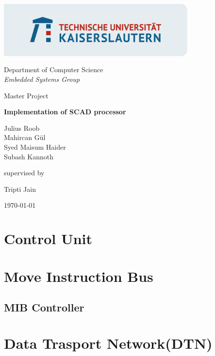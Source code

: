 \documentclass[adraft]{eptcs}
\begin{document}
\begin{titlepage}
	\title{}
	\centering
	\includegraphics[width=0.75\textwidth]{TUKL_LOGO_FELD_LINKS_RGB}\par\vspace{1cm}
	{\Large Department of Computer Science \\ \it Embedded Systems Group \par}
	\vspace{1cm}
	{\Large Master Project\par}
	\vspace{1.5cm}
	{\huge\bfseries Implementation of SCAD processor \par}
	\vspace{2cm}
	{\Large Julius Roob \\ Mahircan G{\"u}l \\ Syed Maisum Haider \\ Subash Kannoth \par}
	\vfill
	supervised by\par
	\Large{Tripti Jain}
	\vfill
	{\large \today\par}
\end{titlepage}

		 \newpage
		\tableofcontents \newpage
	
		
	
	\section{Control Unit}
			
	\section{Move Instruction Bus}	
			
		\subsection{MIB Controller}
			
	\newpage
	\section{Data Trasport Network(DTN)}
		
\end{document}
